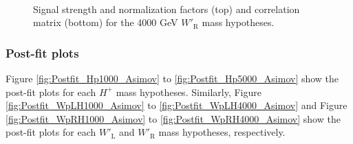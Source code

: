 \begin{figure}[H]
  \centering
  \\
  \caption{Signal strength and normalization factors (top) and correlation matrix (bottom) for the 4000 GeV $W'_{\text{R}}$ mass hypotheses.}
  \label{fig:NormFactorsAndCorrMatrix_WpRH4000}
\end{figure}
\subsubsection{Post-fit plots}
\label{subsubsec:PostfitPlotsForAsimov}
Figure \ref{fig:Postfit_Hp1000_Asimov} to \ref{fig:Postfit_Hp5000_Asimov} show the post-fit plots for each $H^{+}$ mass hypotheses. Similarly,  Figure \ref{fig:Postfit_WpLH1000_Asimov} to \ref{fig:Postfit_WpLH4000_Asimov} and  Figure \ref{fig:Postfit_WpRH1000_Asimov} to \ref{fig:Postfit_WpRH4000_Asimov} show the post-fit plots for each $W'_{\text{L}}$ and $W'_{\text{R}}$ mass hypotheses, respectively.

